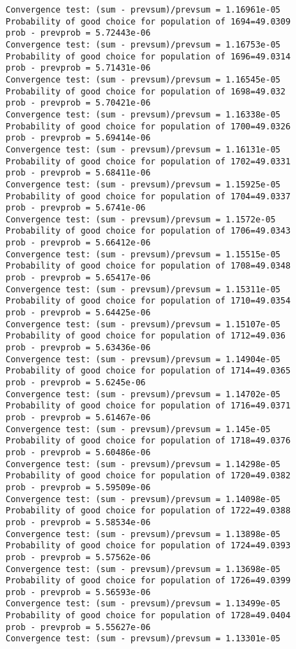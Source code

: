 \documentclass[11pt,onecolumn]{article}
\begin{document}
\begin{verbatim}
Convergence test: (sum - prevsum)/prevsum = 1.16961e-05
Probability of good choice for population of 1694=49.0309
prob - prevprob = 5.72443e-06
Convergence test: (sum - prevsum)/prevsum = 1.16753e-05
Probability of good choice for population of 1696=49.0314
prob - prevprob = 5.71431e-06
Convergence test: (sum - prevsum)/prevsum = 1.16545e-05
Probability of good choice for population of 1698=49.032
prob - prevprob = 5.70421e-06
Convergence test: (sum - prevsum)/prevsum = 1.16338e-05
Probability of good choice for population of 1700=49.0326
prob - prevprob = 5.69414e-06
Convergence test: (sum - prevsum)/prevsum = 1.16131e-05
Probability of good choice for population of 1702=49.0331
prob - prevprob = 5.68411e-06
Convergence test: (sum - prevsum)/prevsum = 1.15925e-05
Probability of good choice for population of 1704=49.0337
prob - prevprob = 5.6741e-06
Convergence test: (sum - prevsum)/prevsum = 1.1572e-05
Probability of good choice for population of 1706=49.0343
prob - prevprob = 5.66412e-06
Convergence test: (sum - prevsum)/prevsum = 1.15515e-05
Probability of good choice for population of 1708=49.0348
prob - prevprob = 5.65417e-06
Convergence test: (sum - prevsum)/prevsum = 1.15311e-05
Probability of good choice for population of 1710=49.0354
prob - prevprob = 5.64425e-06
Convergence test: (sum - prevsum)/prevsum = 1.15107e-05
Probability of good choice for population of 1712=49.036
prob - prevprob = 5.63436e-06
Convergence test: (sum - prevsum)/prevsum = 1.14904e-05
Probability of good choice for population of 1714=49.0365
prob - prevprob = 5.6245e-06
Convergence test: (sum - prevsum)/prevsum = 1.14702e-05
Probability of good choice for population of 1716=49.0371
prob - prevprob = 5.61467e-06
Convergence test: (sum - prevsum)/prevsum = 1.145e-05
Probability of good choice for population of 1718=49.0376
prob - prevprob = 5.60486e-06
Convergence test: (sum - prevsum)/prevsum = 1.14298e-05
Probability of good choice for population of 1720=49.0382
prob - prevprob = 5.59509e-06
Convergence test: (sum - prevsum)/prevsum = 1.14098e-05
Probability of good choice for population of 1722=49.0388
prob - prevprob = 5.58534e-06
Convergence test: (sum - prevsum)/prevsum = 1.13898e-05
Probability of good choice for population of 1724=49.0393
prob - prevprob = 5.57562e-06
Convergence test: (sum - prevsum)/prevsum = 1.13698e-05
Probability of good choice for population of 1726=49.0399
prob - prevprob = 5.56593e-06
Convergence test: (sum - prevsum)/prevsum = 1.13499e-05
Probability of good choice for population of 1728=49.0404
prob - prevprob = 5.55627e-06
Convergence test: (sum - prevsum)/prevsum = 1.13301e-05

\end{verbatim}
\end{document}
